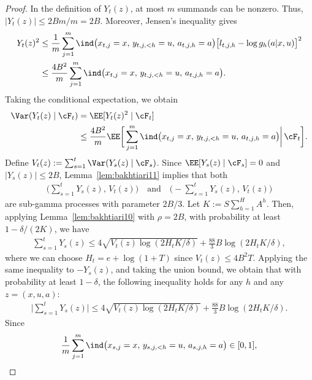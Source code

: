 \documentclass[11pt]{article}
\begin{document}
\begin{proof}
In the definition of $Y_t(z)$, at most $m$ summands can be nonzero. Thus, $|Y_t(z)| \le 2Bm/m = 2B$. Moreover, Jensen's inequality gives
\begin{align*}
    Y_t(z)^2
    &\leq
    \frac1m\sum_{j=1}^m
    \ind\bigl(
        x_{t,j}=x,\,
        y_{t,j,<h}=u,\,
        a_{t,j,h}=a
    \bigr)
    \bigl[
        l_{t,j,h}-\log g_h(a|x,u)
    \bigr]^2\\
    &\leq
    \frac{4B^2}{m}
    \sum_{j=1}^m
    \ind\bigl(
        x_{t,j}=x,\,
        y_{t,j,<h}=u,\,
        a_{t,j,h}=a
    \bigr).
\end{align*}
Taking the conditional expectation, we obtain
\begin{align}
    \Var(Y_t(z)\mid\cF_t)
    &=
    \EE[Y_t(z)^2\mid\cF_t]\notag\\
    &\leq
    \frac{4B^2}{m}
    \EE\bigg[
        \sum_{j=1}^m
    \ind\bigl(
        x_{t,j}=x,\,
        y_{t,j,<h}=u,\,
        a_{t,j,h}=a
    \bigr)\bigg|\,
        \cF_t
    \bigg].
    \label{eq:bernstein-variance}
\end{align}
Define $V_t(z):=\sum_{s=1}^t\Var(Y_s(z)\mid\cF_s)$. Since $\EE[Y_s(z)\mid\cF_s]=0$ and $|Y_s(z)|\leq2B$,
Lemma~\ref{lem:bakhtiari11} implies that both
\begin{align*}
    \bigg(
        \sum_{s=1}^tY_s(z),\, V_t(z)
    \bigg)
    \quad\text{and}\quad
    \bigg(
        -\sum_{s=1}^tY_s(z),\, V_t(z)
    \bigg)
\end{align*}
are sub-gamma processes with parameter $2B/3$. Let $K:=S\sum_{h=1}^H A^h$. 
Then, applying Lemma~\ref{lem:bakhtiari10} with $\rho=2B$, with probability at least $1-\delta/(2K)$, we have
\begin{align}
\label{eq:bernstein}
    \sum_{s=1}^tY_s(z) \le 4 \sqrt{V_t(z) \log (2H_tK/\delta)} + \frac{88}{3}B\log(2H_tK/\delta),
\end{align}
where we can choose $H_t = e+\log(1+T)$ since $V_t(z)\leq4B^2T$. Applying the same inequality to $-Y_s(z)$, and taking the union bound, we obtain that with probability at least $1-\delta$, the following inequality holds for any $h$ and any $z=(x,u,a)$:
\begin{align*}
    \bigg|\sum_{s=1}^tY_s(z)\bigg| \le 4 \sqrt{V_t(z) \log (2H_tK/\delta)} + \frac{88}{3}B\log(2H_tK/\delta).
\end{align*}
Since
\begin{align*}
    \frac1m\sum_{j=1}^m
    \ind\bigl(
        x_{s,j}=x,\,
        y_{s,j,<h}=u,\,
        a_{s,j,h}=a
    \bigr)
    \in[0,1],
\end{align*}

\end{proof}
\end{document}
